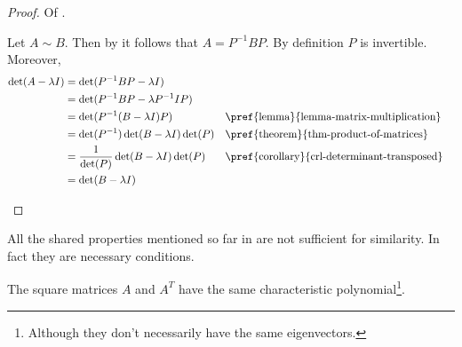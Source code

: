 \begin{proof}
	Of .
	\begin{flushleft}
		Let $A \sim B$. Then by 
		it follows that $A=P^{-1}BP$. By definition $P$ is invertible. Moreover,
		\begin{align*}
			\det(A - \lambda I) & = \det(P^{-1}BP - \lambda I)                                                                           \\
			                    & = \det(P^{-1}BP - \lambda P^{-1}IP)                                                                    \\
			                    & = \det(P^{-1}(B - \lambda I)P)                &  & \text{\pref{lemma}{lemma-matrix-multiplication}}    \\
			                    & = \det(P^{-1})\det(B - \lambda I)\det(P)      &  & \text{\pref{theorem}{thm-product-of-matrices}}      \\
			                    & = \frac{1}{\det(P)}\det(B - \lambda I)\det(P) &  & \text{\pref{corollary}{crl-determinant-transposed}} \\
			                    & = \det(B - \lambda I)
		\end{align*}
	\end{flushleft}
\end{proof}

\begin{rem}
	All the shared properties mentioned so far in 
	are not sufficient for similarity. In fact they are necessary conditions.
\end{rem}

\begin{thm}
	The square matrices $A$ and $A^T$ have the same characteristic polynomial\footnote{Although
		they don't necessarily have the same eigenvectors.}.
\end{thm}


